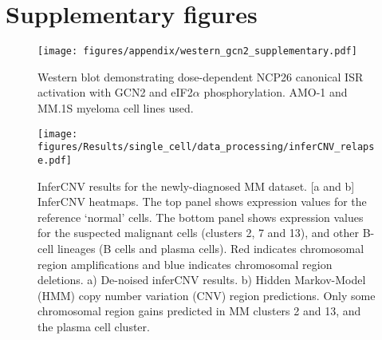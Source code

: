 \chapter{Supplementary figures}

\begin{figure}[ht]
\centering
\texttt{[image: figures/appendix/western\_gcn2\_supplementary.pdf]}
\caption[GCN2 and eIF2$\alpha$ western blot ]{Western blot demonstrating dose-dependent NCP26 canonical ISR activation with GCN2 and eIF2$\alpha$ phosphorylation. AMO-1 and MM.1S myeloma cell lines used.
}
\label{fig:sup_western}
\end{figure}



\begin{figure}[htb]
    \centering
    \texttt{[image: figures/Results/single\_cell/data\_processing/inferCNV\_relapse.pdf]}
    \caption[inferCNV- newly-diagnosed MM]{InferCNV results for the newly-diagnosed MM dataset.
    [a and b] InferCNV heatmaps.
        The top panel shows expression values for the reference `normal' cells.
        The bottom panel shows expression values for the suspected malignant cells (clusters 2, 7 and 13), and other B-cell lineages (B cells and plasma cells).
        Red indicates chromosomal region amplifications and blue indicates chromosomal region deletions.
    a) De-noised inferCNV results.
    b) Hidden Markov-Model (HMM) copy number variation (CNV) region predictions.
        Only some chromosomal region gains predicted in MM clusters 2 and 13, and the plasma cell cluster.
    }
    \label{fig:inferCNV_naive}
\end{figure}
%